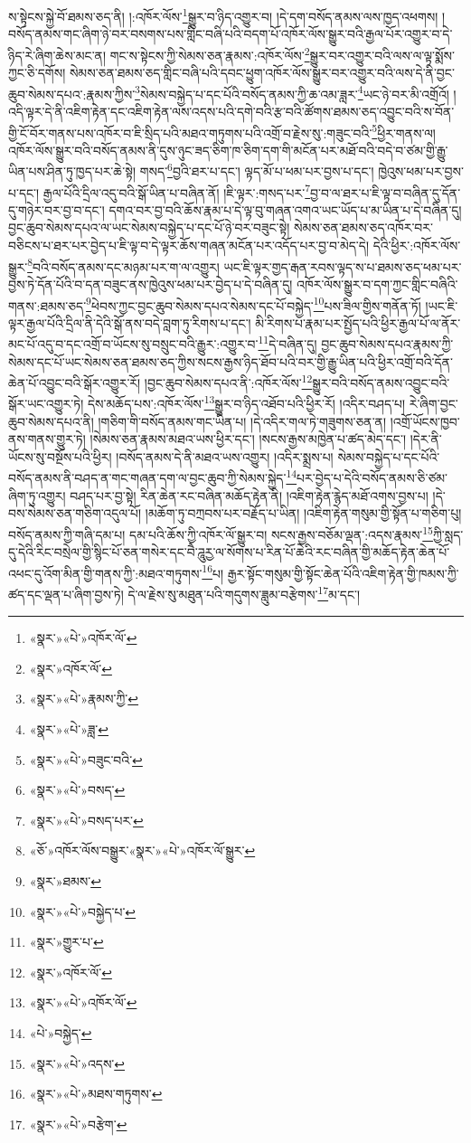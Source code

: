 ས་སྟེངས་སྐྱེ་བོ་ཐམས་ཅད་ནི། །:འཁོར་ལོས་\footnote{«སྣར་»«པེ་»འཁོར་ལོ་}སྒྱུར་བ་ཉིད་འགྱུར་བ། །དེ་དག་བསོད་ནམས་ལས་ཁྱད་འཕགས། །བསོད་ནམས་གང་ཞིག་ཉེ་བར་བསགས་པས་གླིང་བཞི་པའི་བདག་པོ་འཁོར་ལོས་སྒྱུར་བའི་རྒྱལ་པོར་འགྱུར་བ་དེ་ཉིད་རེ་ཞིག་ཆེས་མང་ན། གང་ས་སྟེངས་ཀྱི་སེམས་ཅན་རྣམས་:འཁོར་ལོས་\footnote{«སྣར་»འཁོར་ལོ་}སྒྱུར་བར་འགྱུར་བའི་ལས་ལ་ལྟ་སྨོས་ཀྱང་ཅི་དགོས། སེམས་ཅན་ཐམས་ཅད་གླིང་བཞི་པའི་དབང་ཕྱུག་འཁོར་ལོས་སྒྱུར་བར་འགྱུར་བའི་ལས་དེ་ནི་བྱང་ཆུབ་སེམས་དཔའ་:རྣམས་ཀྱིས་\footnote{«སྣར་»«པེ་»རྣམས་ཀྱི་}སེམས་བསྐྱེད་པ་དང་པོའི་བསོད་ནམས་ཀྱི་ཆ་འམ་ཟླར་\footnote{«སྣར་»«པེ་»ཟླ་}ཡང་ཉེ་བར་མི་འགྲོའོ། །འདི་ལྟར་དེ་ནི་འཇིག་རྟེན་དང་འཇིག་རྟེན་ལས་འདས་པའི་དགེ་བའི་རྩ་བའི་ཚོགས་ཐམས་ཅད་འབྱུང་བའི་ས་བོན་གྱི་ངོ་བོར་གནས་པས་འཁོར་བ་ཇི་སྲིད་པའི་མཐའ་གཏུགས་པའི་འགྲོ་བ་རྗེས་སུ་:གཟུང་བའི་\footnote{«སྣར་»«པེ་»བཟུང་བའི་}ཕྱིར་གནས་ལ། འཁོར་ལོས་སྒྱུར་བའི་བསོད་ནམས་ནི་དུས་ཉུང་ཟད་ཅིག་ཁ་ཅིག་དག་གི་མངོན་པར་མཐོ་བའི་བདེ་བ་ཙམ་གྱི་རྒྱུ་ཡིན་པས་ཤིན་ཏུ་ཁྱད་པར་ཆེ་སྟེ། གསད་\footnote{«སྣར་»«པེ་»བསད་}བྱའི་ཐར་པ་དང་། ལྟད་མོ་པ་ཕམ་པར་བྱས་པ་དང་། ཁྱེའུས་ཕམ་པར་བྱས་པ་དང་། རྒྱལ་པོའི་དྲིལ་འདུ་བའི་སྒོ་ཡིན་པ་བཞིན་ནོ། །ཇི་ལྟར་:གསད་པར་\footnote{«སྣར་»«པེ་»བསད་པར་}བྱ་བ་ལ་ཐར་པ་ཇི་ལྟ་བ་བཞིན་དུ་དོན་དུ་གཉེར་བར་བྱ་བ་དང་། དགའ་བར་བྱ་བའི་ཆོས་རྣམ་པ་དེ་ལྟ་བུ་གཞན་འགའ་ཡང་ཡོད་པ་མ་ཡིན་པ་དེ་བཞིན་དུ། བྱང་ཆུབ་སེམས་དཔའ་ལ་ཡང་སེམས་བསྐྱེད་པ་དང་པོ་ཉེ་བར་བཟུང་སྟེ། སེམས་ཅན་ཐམས་ཅད་འཁོར་བར་བཅིངས་པ་ཐར་པར་བྱེད་པ་ཇི་ལྟ་བ་དེ་ལྟར་ཆོས་གཞན་མངོན་པར་འདོད་པར་བྱ་བ་མེད་དེ། དེའི་ཕྱིར་:འཁོར་ལོས་སྒྱུར་\footnote{«ཅོ་»འཁོར་ལོས་བསྒྱུར་«སྣར་»«པེ་»འཁོར་ལོ་སྒྱུར་}བའི་བསོད་ནམས་དང་མཉམ་པར་ག་ལ་འགྱུར། ཡང་ཇི་ལྟར་གྱད་རྒན་རབས་ལྟད་ས་པ་ཐམས་ཅད་ཕམ་པར་བྱས་ཏེ་དོན་པོའི་བ་དན་བཟུང་ནས་ཁྱེའུས་ཕམ་པར་བྱེད་པ་དེ་བཞིན་དུ། འཁོར་ལོས་སྒྱུར་བ་དག་ཀྱང་གླིང་བཞིའི་གནས་:ཐམས་ཅད་\footnote{«སྣར་»ཐམས་}ཕེབས་ཀྱང་བྱང་ཆུབ་སེམས་དཔའ་སེམས་དང་པོ་བསྐྱེད་\footnote{«སྣར་»«པེ་»བསྐྱེད་པ་}པས་ཟིལ་གྱིས་གནོན་ཏོ། །ཡང་ཇི་ལྟར་རྒྱལ་པོའི་དྲིལ་ནི་དེའི་སྒོ་ནས་བདེ་བླག་ཏུ་རིགས་པ་དང་། མི་རིགས་པ་རྣམ་པར་སྤྱོད་པའི་ཕྱིར་རྒྱལ་པོ་ལ་ནོར་མང་པོ་འདུ་བ་དང་འགྲོ་བ་ཡོངས་སུ་བསྲུང་བའི་རྒྱུར་:འགྱུར་བ་\footnote{«སྣར་»གྱུར་པ་}དེ་བཞིན་དུ། བྱང་ཆུབ་སེམས་དཔའ་རྣམས་ཀྱི་སེམས་དང་པོ་ཡང་སེམས་ཅན་ཐམས་ཅད་ཀྱིས་སངས་རྒྱས་ཉིད་ཐོབ་པའི་བར་གྱི་རྒྱུ་ཡིན་པའི་ཕྱིར་འགྲོ་བའི་དོན་ཆེན་པོ་འབྱུང་བའི་སྒོར་འགྱུར་རོ། །བྱང་ཆུབ་སེམས་དཔའ་ནི་:འཁོར་ལོས་\footnote{«སྣར་»འཁོར་ལོ་}སྒྱུར་བའི་བསོད་ནམས་འབྱུང་བའི་སྒོར་ཡང་འགྱུར་ཏེ། དེས་མཆོད་པས་:འཁོར་ལོས་\footnote{«སྣར་»«པེ་»འཁོར་ལོ་}སྒྱུར་བ་ཉིད་འཐོབ་པའི་ཕྱིར་རོ། །འདིར་བཤད་པ། རེ་ཞིག་བྱང་ཆུབ་སེམས་དཔའ་ནི། །གཅིག་གི་བསོད་ནམས་གང་ཡིན་པ། །དེ་འདིར་གལ་ཏེ་གཟུགས་ཅན་ན། །འགྲོ་ཡོངས་ཁྱབ་ནས་གནས་གྱུར་ཏེ། །སེམས་ཅན་རྣམས་མཐའ་ཡས་ཕྱིར་དང་། །སངས་རྒྱས་མཁྱེན་པ་ཚད་མེད་དང་། །དེར་ནི་ཡོངས་སུ་བསྔོས་པའི་ཕྱིར། །བསོད་ནམས་དེ་ནི་མཐའ་ཡས་འགྱུར། །འདིར་སྨྲས་པ། སེམས་བསྐྱེད་པ་དང་པོའི་བསོད་ནམས་ནི་བཤད་ན་གང་གཞན་དག་ལ་བྱང་ཆུབ་ཀྱི་སེམས་སྐྱེད་\footnote{«པེ་»བསྐྱེད་}པར་བྱེད་པ་དེའི་བསོད་ནམས་ཅི་ཙམ་ཞིག་ཏུ་འགྱུར། བཤད་པར་བྱ་སྟེ། རིན་ཆེན་རང་བཞིན་མཆོད་རྟེན་ནི། །འཇིག་རྟེན་རྙེད་མཐོ་འགས་བྱས་པ། །དེ་བས་སེམས་ཅན་གཅིག་འདུལ་པོ། །མཆོག་ཏུ་བཀྲབས་པར་བརྗོད་པ་ཡིན། །འཇིག་རྟེན་གསུམ་གྱི་སྟོན་པ་གཅིག་པུ། བསོད་ནམས་ཀྱི་གཞི་དམ་པ། དམ་པའི་ཆོས་ཀྱི་འཁོར་ལོ་སྒྱུར་བ། སངས་རྒྱས་བཅོམ་ལྡན་:འདས་རྣམས་\footnote{«སྣར་»«པེ་»འདས་}ཀྱི་སླད་དུ་དེའི་རིང་བསྲེལ་གྱི་སྙིང་པོ་ཅན་གསེར་དང་བཻ་ཌཱུརྱ་ལ་སོགས་པ་རིན་པོ་ཆེའི་རང་བཞིན་གྱི་མཆོད་རྟེན་ཆེན་པོ་འཕང་དུ་འོག་མིན་གྱི་གནས་ཀྱི་:མཐའ་གཏུགས་\footnote{«སྣར་»«པེ་»མཐས་གཏུགས་}པ། རྒྱར་སྟོང་གསུམ་གྱི་སྟོང་ཆེན་པོའི་འཇིག་རྟེན་གྱི་ཁམས་ཀྱི་ཚད་དང་ལྡན་པ་ཞིག་བྱས་ཏེ། དེ་ལ་རྗེས་སུ་མཐུན་པའི་གདུགས་ཟླུམ་བརྩེགས་\footnote{«སྣར་»«པེ་»བརྩེག་}མ་དང་། 
